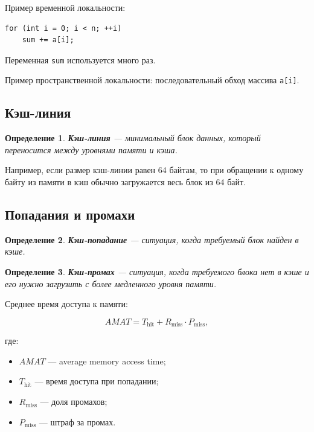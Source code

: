 \documentclass[12pt,a4paper]{article}
\newtheorem{definition}{Определение}
\begin{document}
Пример временной локальности:

\begin{lstlisting}
for (int i = 0; i < n; ++i)
    sum += a[i];
\end{lstlisting}

Переменная \texttt{sum} используется много раз.

Пример пространственной локальности: последовательный обход массива \texttt{a[i]}.

\subsection{Кэш-линия}

\begin{definition}
\textbf{Кэш-линия} --- минимальный блок данных, который переносится между уровнями памяти и кэша.
\end{definition}

Например, если размер кэш-линии равен 64 байтам, то при обращении к одному байту из памяти в кэш обычно загружается весь блок из 64 байт.

\subsection{Попадания и промахи}

\begin{definition}
\textbf{Кэш-попадание} --- ситуация, когда требуемый блок найден в кэше.
\end{definition}

\begin{definition}
\textbf{Кэш-промах} --- ситуация, когда требуемого блока нет в кэше и его нужно загрузить с более медленного уровня памяти.
\end{definition}

Среднее время доступа к памяти:

\[
    AMAT = T_{\text{hit}} + R_{\text{miss}} \cdot P_{\text{miss}},
\]

где:

\begin{itemize}
    \item $AMAT$ --- average memory access time;
    \item $T_{\text{hit}}$ --- время доступа при попадании;
    \item $R_{\text{miss}}$ --- доля промахов;
    \item $P_{\text{miss}}$ --- штраф за промах.
\end{itemize}
\end{document}
